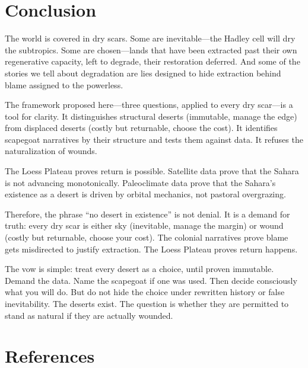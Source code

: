 \documentclass[12pt,a4paper]{article}
\begin{document}
\section{Conclusion}

The world is covered in dry scars. Some are inevitable—the Hadley cell will dry the subtropics. Some are chosen—lands that have been extracted past their own regenerative capacity, left to degrade, their restoration deferred. And some of the stories we tell about degradation are lies designed to hide extraction behind blame assigned to the powerless.

The framework proposed here—three questions, applied to every dry scar—is a tool for clarity. It distinguishes structural deserts (immutable, manage the edge) from displaced deserts (costly but returnable, choose the cost). It identifies scapegoat narratives by their structure and tests them against data. It refuses the naturalization of wounds.

The Loess Plateau proves return is possible. Satellite data prove that the Sahara is not advancing monotonically. Paleoclimate data prove that the Sahara's existence as a desert is driven by orbital mechanics, not pastoral overgrazing.

Therefore, the phrase ``no desert in existence'' is not denial. It is a demand for truth: every dry scar is either sky (inevitable, manage the margin) or wound (costly but returnable, choose your cost). The colonial narratives prove blame gets misdirected to justify extraction. The Loess Plateau proves return happens.

The vow is simple: treat every desert as a choice, until proven immutable. Demand the data. Name the scapegoat if one was used. Then decide consciously what you will do. But do not hide the choice under rewritten history or false inevitability. The deserts exist. The question is whether they are permitted to stand as natural if they are actually wounded.

\newpage

\section*{References}
\end{document}
